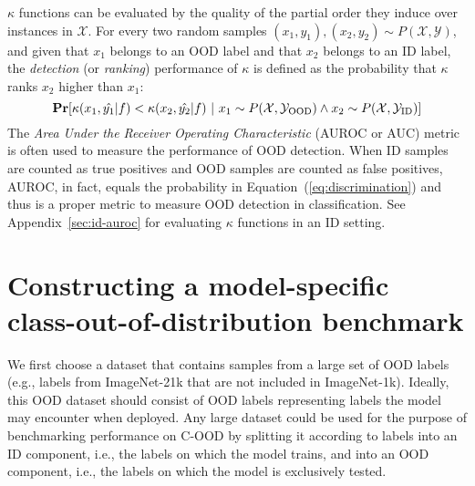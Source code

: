 \documentclass[table]{article} \usepackage{PRIMEarxiv}
\newcommand{\cY}{{\cal Y}}
\newcommand{\cX}{{\cal X}}
\begin{document}
$\kappa$ functions can be evaluated by the quality of the partial order they induce over instances in $\mathcal{X}$.
For every two random samples $(x_1,y_1),(x_2,y_2)\sim P(\mathcal{X},\mathcal{Y})$, and given that $x_1$ belongs to an OOD label and that $x_2$ belongs to an ID label, the \emph{detection} (or \emph{ranking}) performance of $\kappa$ is defined as the probability that $\kappa$ ranks $x_2$ higher than $x_1$: 
\begin{equation}
\label{eq:discrimination}
        \mathbf{Pr}[\kappa(x_1,\hat{y_1}|f)<\kappa(x_2,\hat{y_2}|f) \ | \ x_1 \sim  P(\cX, \cY_{\text{OOD}}) \land x_2 \sim  P(\cX, \cY_{\text{ID}})]
\end{equation}
The \emph{Area Under the Receiver Operating Characteristic} (AUROC or AUC) metric is often used to measure the performance of OOD detection. When ID samples are counted as true positives and OOD samples are counted as false positives, AUROC, in fact, equals the probability in Equation~(\ref{eq:discrimination}) \citep{FAWCETT2006861} and thus is a proper metric to measure OOD detection in classification. See Appendix~\ref{sec:id-auroc} for evaluating $\kappa$ functions in an ID setting.

\section{Constructing a model-specific class-out-of-distribution benchmark}
\label{sec:construction}
We first choose a dataset that contains samples from a large set of OOD labels (e.g., labels from ImageNet-21k that are not included in ImageNet-1k). Ideally, this OOD dataset should consist of OOD labels representing labels the model may encounter when deployed.
Any large dataset could be used for the purpose of benchmarking performance on C-OOD by splitting it according to labels into an ID component, i.e., the labels on which the model trains, and into an OOD component, i.e., the labels on which the model is exclusively tested. 
\end{document}
